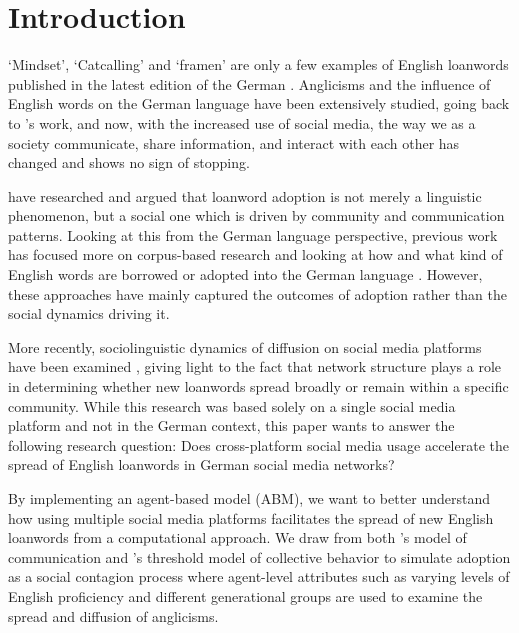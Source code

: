 \documentclass[12pt]{article}
\begin{document}
\section{Introduction}

‘Mindset’, ‘Catcalling’ and ‘framen’ are only a few examples of English loanwords published in the latest edition of the German \textcite{duden2024}. Anglicisms and the influence of English words on the German language have been extensively studied, going back to \citeauthor{carstensen1965}'s \parencite*{carstensen1965} work, and now, with the increased use of social media, the way we as a society communicate, share information, and interact with each other has changed and shows no sign of stopping.
 
\textcite{poplack1984} have researched and argued that loanword adoption is not merely a linguistic phenomenon, but a social one which is driven by community and communication patterns. Looking at this from the German language perspective, previous work has focused more on corpus-based research and looking at how and what kind of English words are borrowed or adopted into the German language \parencite{coats2019}. However, these approaches have mainly captured the outcomes of adoption rather than the social dynamics driving it.

More recently, sociolinguistic dynamics of diffusion on social media platforms have been examined \parencite{wuerschinger2021}, giving light to the fact that network structure plays a role in determining whether new loanwords spread broadly or remain within a specific community. While this research was based solely on a single social media platform and not in the German context, this paper wants to answer the following research question: Does cross-platform social media usage accelerate the spread of English loanwords in German social media networks?

By implementing an agent-based model (ABM), we want to better understand how using multiple social media platforms facilitates the spread of new English loanwords from a computational approach. We draw from both \citeauthor{baronchelli2006}'s \parencite*{baronchelli2006} model of communication and \citeauthor{granovetter1973}'s \parencite*{granovetter1973} threshold model of collective behavior to simulate adoption as a social contagion process where agent-level attributes such as varying levels of English proficiency and different generational groups are used to examine the spread and diffusion of anglicisms. 
\end{document}
